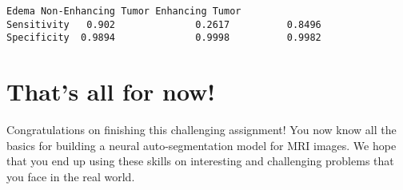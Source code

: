 \documentclass[11pt]{article}
\begin{document}
    \begin{Verbatim}[commandchars=\\\{\}]
              Edema Non-Enhancing Tumor Enhancing Tumor
Sensitivity   0.902              0.2617          0.8496
Specificity  0.9894              0.9998          0.9982

    \end{Verbatim}

    \hypertarget{thats-all-for-now}{%
\section{That's all for now!}\label{thats-all-for-now}}

Congratulations on finishing this challenging assignment! You now know
all the basics for building a neural auto-segmentation model for MRI
images. We hope that you end up using these skills on interesting and
challenging problems that you face in the real world.


    
    
    
    
\end{document}
